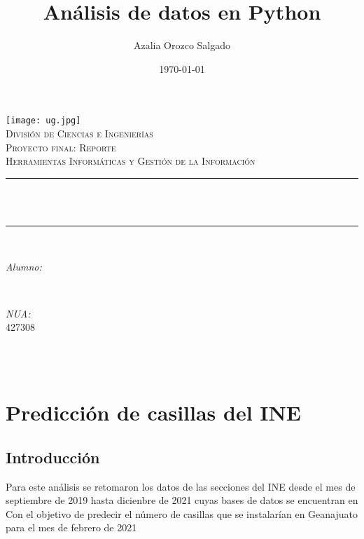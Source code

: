 \documentclass[12pt]{article}
\title{Análisis de datos en Python}
\author{ Azalia Orozco Salgado}
\date{\today}
\makeatletter
\let\thetitle\@title
\let\theauthor\@author
\let\thedate\@date
\makeatother
\begin{document}

\begin{titlepage}
	\centering
    \vspace*{0.5 cm}
    \texttt{[image: ug.jpg]}\\[1.0 cm]	%
    \textsc{\LARGE División de Ciencias e Ingenierías}\\[2.0 cm]
    \textsc{\large Proyecto final: Reporte}\\[0.5 cm]
	\textsc{\large Herramientas Informáticas y Gestión de la Información}\\[0.5 cm]		
	\rule{\linewidth}{0.2 mm} \\[0.4 cm]
	{ \huge \bfseries \thetitle}\\
	\rule{\linewidth}{0.2 mm} \\[1.5 cm]
	
	\begin{minipage}{0.4\textwidth}
		\begin{flushleft} \large
			\emph{Alumno:}\\
			\theauthor
			\end{flushleft}
			\end{minipage}~
			\begin{minipage}{0.4\textwidth}
			\begin{flushright} \large
			\emph{NUA:} \\
			427308							
		\end{flushright}
	\end{minipage}\\[2 cm]
	
	{\large \thedate}\\[2 cm]
 
	\vfill
	
\end{titlepage}

\tableofcontents
\newpage

\section{Predicción de casillas del INE}
\subsection{Introducción}
Para este análisis se retomaron los datos de las secciones del INE desde el mes de septiembre de 2019 hasta dicienbre de 2021 cuyas bases de datos se encuentran en 
Con el objetivo de predecir el número de casillas que se instalarían en Geanajuato para el mes de febrero de 2021
\end{document}
